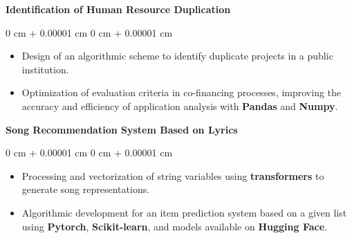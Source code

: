 \documentclass[10pt, letterpaper]{article}
\newenvironment{highlights}{
    \begin{itemize}[
        topsep=0.10 cm,
        parsep=0.10 cm,
        partopsep=0pt,
        itemsep=0pt,
        leftmargin=0 cm + 10pt
    ]
}{
    \end{itemize}
} %
\newenvironment{onecolentry}{
    \begin{adjustwidth}{
        0 cm + 0.00001 cm
    }{
        0 cm + 0.00001 cm
    }
}{
    \end{adjustwidth}
} %
\begin{document}
    \textbf{Identification of Human Resource Duplication}
\vspace{0.10 cm}
\begin{onecolentry}
    \begin{highlights}
    \item Design of an algorithmic scheme to identify duplicate projects in a public institution.
    \item Optimization of evaluation criteria in co-financing processes, improving the accuracy and efficiency of application analysis with \textbf{Pandas} and \textbf{Numpy}.
    \end{highlights}
\end{onecolentry}
\vspace{0.2 cm}

    \textbf{Song Recommendation System Based on Lyrics}
\vspace{0.10 cm}
\begin{onecolentry}
    \begin{highlights}
    \item Processing and vectorization of string variables using \textbf{transformers} to generate song representations.
    \item Algorithmic development for an item prediction system based on a given list using \textbf{Pytorch}, \textbf{Scikit-learn}, and models available on \textbf{Hugging Face}.
    \end{highlights}
\end{onecolentry}
\end{document}
